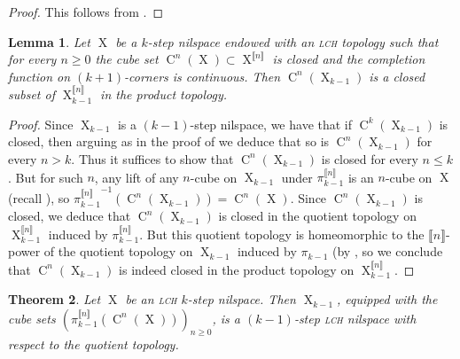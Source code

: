 \documentclass[a4paper,12pt,reqno]{amsart}
\newtheorem{theorem}{Theorem}[section]
\newtheorem{lemma}[theorem]{Lemma}
\theoremstyle{definition}
\newcommand*{\db}[1]{\llbracket #1\rrbracket}
\DeclareMathOperator{\ns}{X}
\DeclareMathOperator{\cu}{C}
\begin{document}
\begin{proof}
This follows from \cite[p.\ 107, Proposition 10]{BourbakiGT1}. 
\end{proof}
\begin{lemma}\label{lem:closure-cube-in-k-1-factor}
Let $\ns$ be a $k$-step nilspace endowed with an \textsc{lch} topology such that for every $n\ge 0$ the cube set $\cu^n(\ns)\subset \ns^{\db{n}}$ is closed and the completion function on $(k+1)$-corners is continuous. Then $\cu^n(\ns_{k-1})$ is a closed subset of $\ns_{k-1}^{\db{n}}$ in the product topology.
\end{lemma}
\begin{proof}
Since $\ns_{k-1}$ is a $(k-1)$-step nilspace, we have that if $\cu^k(\ns_{k-1})$ is closed, then arguing as in the proof of \cite[Lemma 2.1.1]{Cand:Notes2} we deduce that so is $\cu^n(\ns_{k-1})$ for every $n>k$. Thus it suffices to show that $\cu^n(\ns_{k-1})$ is closed for every $n\leq k$. 
But for such $n$, any lift of any $n$-cube on $\ns_{k-1}$ under $\pi_{k-1}^{\db{n}}$ is an $n$-cube on $\ns$ (recall \cite[Remark 3.2.12]{Cand:Notes1}), so ${\pi_{k-1}^{\db{n}}}^{-1}(\cu^n(\ns_{k-1})) = \cu^n(\ns)$. 
Since $\cu^n(\ns_{k-1})$ is closed, we deduce that $\cu^n(\ns_{k-1})$ is closed in the quotient topology on $\ns_{k-1}^{\db{n}}$ induced by $\pi_{k-1}^{\db{n}}$. But this quotient topology is homeomorphic to the $\db{n}$-power of the quotient topology on $\ns_{k-1}$ induced by $\pi_{k-1}$ (by \cite[p.\ 55, Corollary]{BourbakiGT1}, so we conclude that $\cu^n(\ns_{k-1})$ is indeed closed in the product topology on $\ns_{k-1}^{\db{n}}$.\end{proof}
\begin{theorem}\label{thm:factor-of-lch-nil}
Let $\ns$ be an \textsc{lch} $k$-step nilspace. Then $\ns_{k-1}$, equipped with the cube sets $(\pi_{k-1}^{\db{n}}(\cu^n(\ns)))_{n\ge 0}$, is a $(k-1)$-step \textsc{lch} nilspace with respect to the quotient topology.
\end{theorem}
\end{document}
